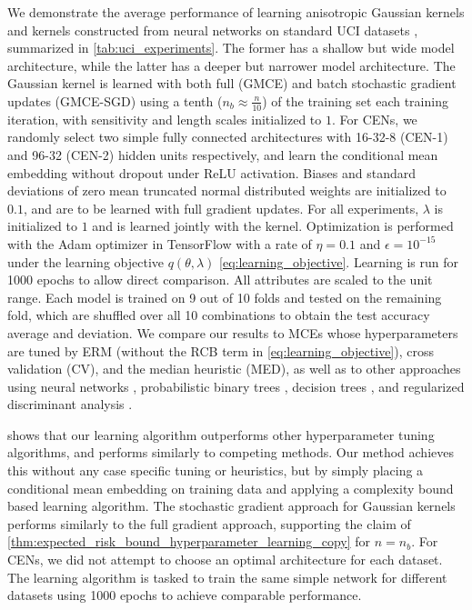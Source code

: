 \documentclass[runningheads, envcountsame, a4paper]{llncs}
\begin{document}
			We demonstrate the average performance of learning anisotropic Gaussian kernels and kernels constructed from neural networks on standard UCI datasets \citep{bache2013uci}, summarized in \cref{tab:uci_experiments}. The former has a shallow but wide model architecture, while the latter has a deeper but narrower model architecture. The Gaussian kernel is learned with both full (G\gls{MCE}) and batch stochastic gradient updates (G\gls{MCE}-SGD) using a tenth ($n_{b} \approx \frac{n}{10}$) of the training set each training iteration, with sensitivity and length scales initialized to $1$. For \glspl{CEN}, we randomly select two simple fully connected architectures with 16-32-8 (\gls{CEN}-1) and 96-32 (\gls{CEN}-2) hidden units respectively, and learn the conditional mean embedding without dropout under ReLU activation. Biases and standard deviations of zero mean truncated normal distributed weights are initialized to $0.1$, and are to be learned with full gradient updates. For all experiments, $\lambda$ is initialized to $1$ and is learned jointly with the kernel. Optimization is performed with the Adam optimizer \citep{kingma2014adam} in TensorFlow \citep{abadi2016tensorflow} with a rate of $\eta = 0.1$ and $\epsilon = 10^{-15}$ under the learning objective $q(\theta, \lambda)$ \eqref{eq:learning_objective}. Learning is run for 1000 epochs to allow direct comparison. All attributes are scaled to the unit range. Each model is trained on 9 out of 10 folds and tested on the remaining fold, which are shuffled over all 10 combinations to obtain the test accuracy average and deviation. We compare our results to \glspl{MCE} whose hyperparameters are tuned by \gls{ERM} (without the \gls{RCB} term in \eqref{eq:learning_objective}), cross validation (CV), and the median heuristic (MED), as well as to other approaches using neural networks \citep[a; c]{kaya2016banknote, freire2009short}, probabilistic binary trees \citep[b]{horton1996probabilistic}, decision trees \citep[d]{zhou2004size}, and regularized discriminant analysis \citep[e]{aeberhard1992comparison}. 
	
			 shows that our learning algorithm outperforms other hyperparameter tuning algorithms, and performs similarly to competing methods. Our method achieves this without any case specific tuning or heuristics, but by simply placing a conditional mean embedding on training data and applying a complexity bound based learning algorithm. The stochastic gradient approach for Gaussian kernels performs similarly to the full gradient approach, supporting the claim of \cref{thm:expected_risk_bound_hyperparameter_learning_copy} for $n = n_{b}$. For \glspl{CEN}, we did not attempt to choose an optimal architecture for each dataset. The learning algorithm is tasked to train the same simple network for different datasets using 1000 epochs to achieve comparable performance. 
	
\end{document}

